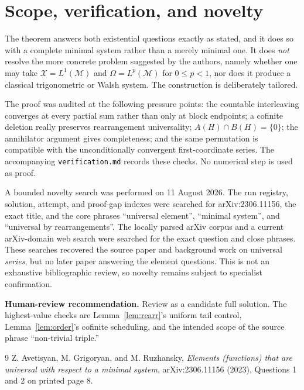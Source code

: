 \documentclass[11pt]{article}
\begin{document}
\section{Scope, verification, and novelty}

The theorem answers both existential questions exactly as stated, and it does
so with a complete minimal system rather than a merely minimal one.  It does
\emph{not} resolve the more concrete problem suggested by the authors, namely
whether one may take $\mathcal X=L^1(\mathcal M)$ and
$\Omega=L^p(\mathcal M)$ for $0\leq p<1$, nor does it produce a classical
trigonometric or Walsh system.  The construction is deliberately tailored.

The proof was audited at the following pressure points: the countable
interleaving converges at every partial sum rather than only at block
endpoints; a cofinite deletion really preserves rearrangement universality;
$A(H)\cap B(H)=\{0\}$; the annihilator argument gives completeness; and the
same permutation is compatible with the unconditionally convergent
first-coordinate series.  The accompanying \texttt{verification.md} records
these checks.  No numerical step is used as proof.

A bounded novelty search was performed on 11 August 2026.  The run registry,
solution, attempt, and proof-gap indexes were searched for arXiv:2306.11156,
the exact title, and the core phrases ``universal element'', ``minimal
system'', and ``universal by rearrangements''.  The locally parsed arXiv
corpus and a current arXiv-domain web search were searched for the exact
question and close phrases.  These searches recovered the source paper and
background work on universal \emph{series}, but no later paper answering the
element questions.  This is not an exhaustive bibliographic review, so
novelty remains subject to specialist confirmation.

\medskip
\noindent\textbf{Human-review recommendation.} Review as a candidate full
solution.  The highest-value checks are Lemma~\ref{lem:rearr}'s uniform tail
control, Lemma~\ref{lem:order}'s cofinite scheduling, and the intended scope of
the source phrase ``non-trivial triple.''

\begin{thebibliography}{9}
Z. Avetisyan, M. Grigoryan, and M. Ruzhansky,
\emph{Elements (functions) that are universal with respect to a minimal
system}, arXiv:2306.11156 (2023), Questions 1 and 2 on printed page 8.
\end{thebibliography}
\end{document}

